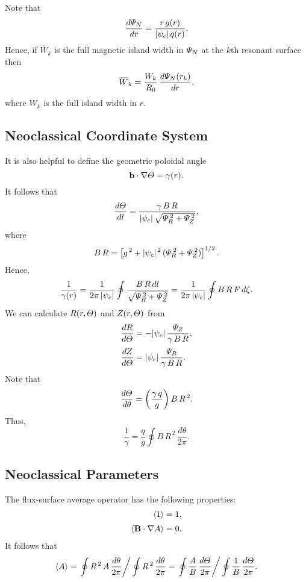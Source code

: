 \documentclass[12pt]{article}
\begin{document}
Note that
\begin{equation}
\frac{d{\mit\Psi}_N}{dr} =\frac{r\,g(r)}{|\psi_c|\,q(r)}.
\end{equation}
Hence, if $\overline{W}_k$ is the full magnetic island width in ${\mit\Psi}_N$ at the 
$k$th resonant surface then
\begin{equation}
\overline{W}_k = \frac{W_k}{R_0}\,\frac{d{\mit\Psi}_N(r_k)}{dr},
\end{equation}
where $W_k$ is the full island width in $r$. 

\subsection{Neoclassical Coordinate System}
It is also helpful to define the geometric poloidal angle
\begin{equation}
{\bf b}\cdot\nabla {\mit\Theta} = \gamma(r).
\end{equation}
It follows that
\begin{equation}
\frac{d{\mit\Theta}}{dl} = \frac{\gamma\,B\,R}{|\psi_c|\,\sqrt{{\mit\Psi}_R^{\,2}+{\mit\Psi}_Z^{\,2}}},
\end{equation}
where
\begin{equation}
B\,R = \left[g^{\,2} + |\psi_c|^{\,2}\,({\mit\Psi}_R^{\,2}+{\mit\Psi}_Z^{\,2})\right]^{1/2}.
\end{equation}
Hence,
\begin{equation}
\frac{1}{\gamma(r)} = \frac{1}{2\pi\,|\psi_c|}\oint\frac{B\,R\,dl}{\sqrt{{\mit\Psi}_R^{\,2}+{\mit\Psi}_Z^{\,2}}}= \frac{1}{2\pi\,|\psi_c|}\oint B\,R\,F\,d\zeta.
\end{equation}
We can calculate $R(r,{\mit\Theta})$ and $Z(r,{\mit\Theta})$ from 
\begin{align}
\frac{dR}{d{\mit\Theta}} &=-|\psi_c|\,\frac{{\mit\Psi}_Z}{\gamma\,B\,R},\\[0.5ex]
\frac{dZ}{d{\mit\Theta}} &=|\psi_c|\,\frac{{\mit\Psi}_R}{\gamma\,B\,R}.
\end{align}
Note that
\begin{equation}
\frac{d{\mit\Theta}}{d\theta} = \left(\frac{\gamma\,q}{g}\right)B\,R^{\,2}.
\end{equation}
Thus,
\begin{equation}
\frac{1}{\gamma} = \frac{q}{g}\oint B\,R^{\,2}\,\frac{d\theta}{2\pi}.
\end{equation}

\subsection{Neoclassical Parameters}
The flux-surface average operator has the following
properties:
\begin{align}
\langle 1\rangle &= 1,\\[0.5ex]
\langle {\bf B}\cdot\nabla A\rangle &= 0.
\end{align}
It follows that
\begin{equation}\label{e140}
\langle A\rangle =\left.\oint R^{\,2}\,A\,\frac{d\theta}{2\pi}\right/\oint R^{\,2}\,\frac{d\theta}{2\pi}=\left.\oint
\frac{A}{B}\,\frac{d{\mit\Theta}}{2\pi}\right/\oint
\frac{1}{B}\,\frac{d{\mit\Theta}}{2\pi}.
\end{equation}
\end{document}
